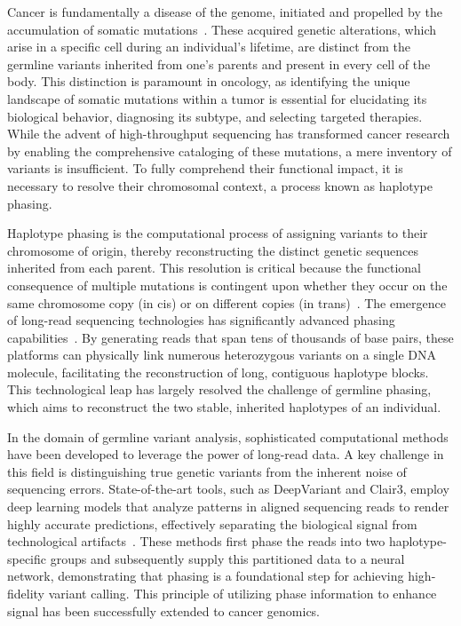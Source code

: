 \documentclass[pdflatex,sn-nature]{sn-jnl}
\begin{document}
Cancer is fundamentally a disease of the genome, initiated and propelled by the accumulation of somatic mutations~\cite{vogelstein2013, stratton2009, vogelstein2004}. These acquired genetic alterations, which arise in a specific cell during an individual's lifetime, are distinct from the germline variants inherited from one's parents and present in every cell of the body. This distinction is paramount in oncology, as identifying the unique landscape of somatic mutations within a tumor is essential for elucidating its biological behavior, diagnosing its subtype, and selecting targeted therapies. While the advent of high-throughput sequencing has transformed cancer research by enabling the comprehensive cataloging of these mutations, a mere inventory of variants is insufficient. To fully comprehend their functional impact, it is necessary to resolve their chromosomal context, a process known as haplotype phasing.

Haplotype phasing is the computational process of assigning variants to their chromosome of origin, thereby reconstructing the distinct genetic sequences inherited from each parent. This resolution is critical because the functional consequence of multiple mutations is contingent upon whether they occur on the same chromosome copy (in cis) or on different copies (in trans)~\cite{gamundi2008, ambrodji2024}. The emergence of long-read sequencing technologies has significantly advanced phasing capabilities~\cite{warburton2023, maestri2020, gupta2024}. By generating reads that span tens of thousands of base pairs, these platforms can physically link numerous heterozygous variants on a single DNA molecule, facilitating the reconstruction of long, contiguous haplotype blocks. This technological leap has largely resolved the challenge of germline phasing, which aims to reconstruct the two stable, inherited haplotypes of an individual.

In the domain of germline variant analysis, sophisticated computational methods have been developed to leverage the power of long-read data. A key challenge in this field is distinguishing true genetic variants from the inherent noise of sequencing errors. State-of-the-art tools, such as DeepVariant and Clair3, employ deep learning models that analyze patterns in aligned sequencing reads to render highly accurate predictions, effectively separating the biological signal from technological artifacts~\cite{poplin2018, zheng2022}. These methods first phase the reads into two haplotype-specific groups and subsequently supply this partitioned data to a neural network, demonstrating that phasing is a foundational step for achieving high-fidelity variant calling. This principle of utilizing phase information to enhance signal has been successfully extended to cancer genomics.
\end{document}
